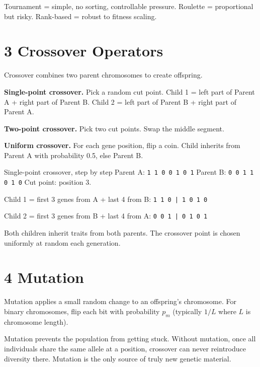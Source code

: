 \documentclass[a4paper,11pt]{article}
\begin{document}
\begin{keytake}
Tournament = simple, no sorting, controllable pressure. Roulette = proportional but risky. Rank-based = robust to fitness scaling.
\end{keytake}

\section{3 \quad Crossover Operators}

Crossover combines two parent chromosomes to create offspring.

\textbf{Single-point crossover.} Pick a random cut point. Child 1 = left part of Parent A + right part of Parent B. Child 2 = left part of Parent B + right part of Parent A.

\textbf{Two-point crossover.} Pick two cut points. Swap the middle segment.

\textbf{Uniform crossover.} For each gene position, flip a coin. Child inherits from Parent A with probability 0.5, else Parent B.

\begin{worked}{Single-point crossover, step by step}
Parent A: \texttt{1 1 0 0 1 0 1} \quad Parent B: \texttt{0 0 1 1 0 1 0} \quad Cut point: position 3.
\begin{steps}
  \item Child 1 = first 3 genes from A + last 4 from B: \texttt{1 1 0 | 1 0 1 0}
  \item Child 2 = first 3 genes from B + last 4 from A: \texttt{0 0 1 | 0 1 0 1}
\end{steps}
Both children inherit traits from both parents. The crossover point is chosen uniformly at random each generation.
\end{worked}

\section{4 \quad Mutation}

Mutation applies a small random change to an offspring's chromosome. For binary chromosomes, flip each bit with probability $p_m$ (typically $1/L$ where $L$ is chromosome length).

\begin{intuition}
Mutation prevents the population from getting stuck. Without mutation, once all individuals share the same allele at a position, crossover can never reintroduce diversity there. Mutation is the only source of truly new genetic material.
\end{intuition}
\end{document}
